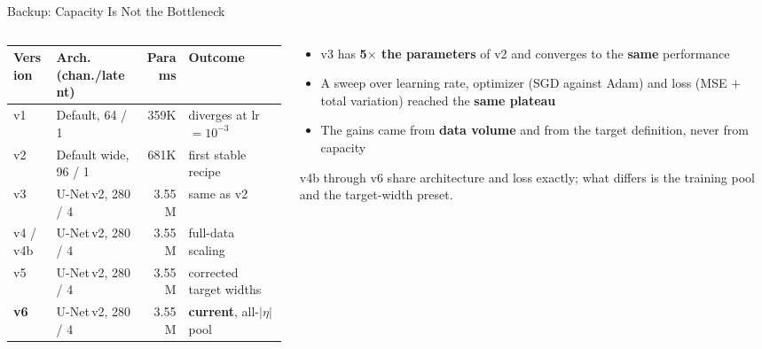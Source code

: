 \documentclass[xcolor=table,aspectratio=169]{beamer}
\begin{document}
\begin{frame}{Backup: Capacity Is Not the Bottleneck}
    \begin{columns}[c]
        \begin{column}{0.62\linewidth}
            \centering
            \footnotesize
            \setlength{\tabcolsep}{4pt}
            \begin{tabular}{llrl}
                \toprule
                Version & Arch. (chan./latent) & Params & Outcome \\
                \midrule
                v1  & Default, 64 / 1     & 359K & diverges at lr$=10^{-3}$ \\
                v2  & Default wide, 96 / 1 & 681K & first stable recipe \\
                v3  & U-Net\,v2, 280 / 4  & 3.55M & same as v2 \\
                v4 / v4b  & U-Net\,v2, 280 / 4  & 3.55M & full-data scaling \\
                v5  & U-Net\,v2, 280 / 4 & 3.55M & corrected target widths \\
                \textbf{v6} & U-Net\,v2, 280 / 4 & 3.55M & \textbf{current}, all-$|\eta|$ pool \\
                \bottomrule
            \end{tabular}
        \end{column}
        \begin{column}{0.38\linewidth}
            \footnotesize
            \begin{itemize}\setlength\itemsep{0.35em}
                \item v3 has \textbf{5$\times$ the parameters} of v2 and converges to the \textbf{same} performance
                \item A sweep over learning rate, optimizer (SGD against Adam) and loss (MSE $+$ total variation) reached the \textbf{same plateau}
                \item The gains came from \textbf{data volume} and from the target definition, never from capacity
            \end{itemize}
            \vspace{0.4em}
            {\footnotesize\textcolor{black!55}{v4b through v6 share architecture and
            loss exactly; what differs is the training pool and the target-width preset.}}
        \end{column}
    \end{columns}
\end{frame}
\end{document}
